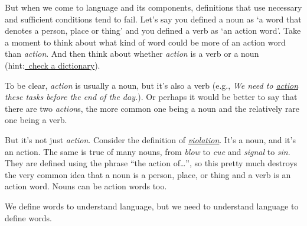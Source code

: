 But when we come to language and its components, definitions that use necessary and sufficient conditions tend to fail. Let's say you defined a noun as `a word that denotes a person, place or thing' and you defined a verb as `an action word'. Take a moment to think about what kind of word could be more of an action word than \textit{action}. And then think about whether \textit{action} is a verb or a noun (hint:\href{https://www.ldoceonline.com/}{~check a dictionary}).

To be clear, \textit{action} is usually a noun, but it's also a verb (e.g., \textit{We need to \uline{action} these tasks before the end of the day.}). Or perhaps it would be better to say that there are two \textit{action}s, the more common one being a noun and the relatively rare one being a verb.

But it's not just \textit{action}. Consider the definition of \href{https://www.ldoceonline.com/dictionary/violation}{\textit{violation}}. It's a noun, and it's an action. The same is true of many nouns, from \textit{blow} to \textit{cue} and \textit{signal} to \textit{sin}. They are defined using the phrase ``the action of\dots'', so this pretty much destroys the very common idea that a noun is a person, place, or thing and a verb is an action word. Nouns can be action words too.

We define words to understand language, but we need to understand language to define words.

